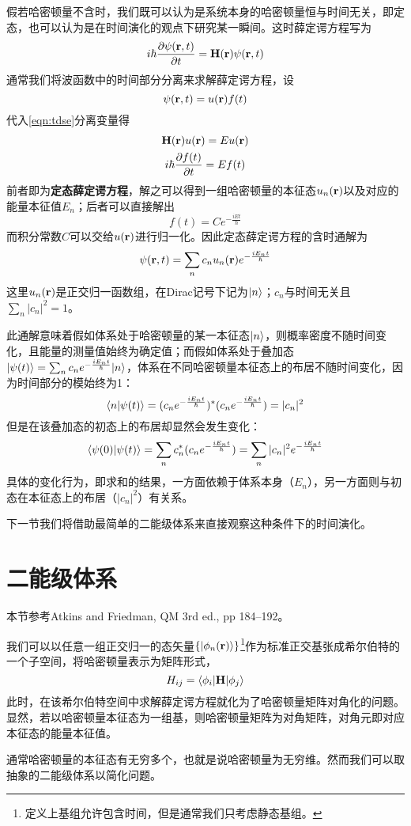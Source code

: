 假若哈密顿量不含时，我们既可以认为是系统本身的哈密顿量恒与时间无关，即定态，也可以认为是在时间演化的观点下研究某一瞬间。这时薛定谔方程写为
\begin{equation}\label{eqn:tdse}
i\hbar \dfrac{\partial \psi(\bm{\mathrm{r}},t)}{\partial t}=\bm{\mathrm{H}}(\bm{\mathrm{r}}) \psi(\bm{\mathrm{r}},t)
\end{equation}
通常我们将波函数中的时间部分分离来求解薛定谔方程，设
\begin{equation}\label{key}
\psi(\bm{\mathrm{r}},t)=u(\bm{\mathrm{r}})f(t)
\end{equation}
代入\eqref{eqn:tdse}分离变量得
\begin{gather}
\bm{\mathrm{H}}(\bm{\mathrm{r}}) u(\bm{\mathrm{r}})=E u(\bm{\mathrm{r}})\label{eqn:TISE}\\
i\hbar \dfrac{\partial f(t)}{\partial t}=Ef(t)\label{eqn:timepart}
\end{gather}
前者即为\textbf{定态薛定谔方程}，解之可以得到一组哈密顿量的本征态$ u_n(\bm{\mathrm{r}}) $以及对应的能量本征值$ E_n $；后者可以直接解出
\begin{equation}\label{key}
f(t)=Ce^{-\frac{iEt}{\hbar}}
\end{equation}
而积分常数$ C $可以交给$ u(\bm{\mathrm{r}}) $进行归一化。因此定态薛定谔方程的含时通解为
\begin{equation}\label{key}
\psi(\bm{\mathrm{r}},t)=\sum_nc_nu_n(\bm{\mathrm{r}})e^{-\frac{iE_nt}{\hbar}}
\end{equation}
这里$ u_n(\bm{\mathrm{r}}) $是正交归一函数组，在Dirac记号下记为$ |n\rangle $；$ c_n $与时间无关且$ \sum_n |c_n|^2=1 $。

此通解意味着假如体系处于哈密顿量的某一本征态$ |n\rangle $，则概率密度不随时间变化，且能量的测量值始终为确定值；而假如体系处于叠加态$ |\psi(t)\rangle=\sum_nc_ne^{-\frac{iE_nt}{\hbar}}|n\rangle $，体系在不同哈密顿量本征态上的布居不随时间变化，因为时间部分的模始终为1：
\begin{equation}\label{key}
\langle n|\psi(t)\rangle=(c_ne^{-\frac{iE_nt}{\hbar}})^*(c_ne^{-\frac{iE_nt}{\hbar}})=|c_n|^2
\end{equation} 
但是在该叠加态的初态上的布居却显然会发生变化：
\begin{equation}\label{key}
\langle\psi(0)|\psi(t)\rangle=\sum_nc_n^*(c_ne^{-\frac{iE_nt}{\hbar}})=\sum_n|c_n|^2e^{-\frac{iE_nt}{\hbar}}
\end{equation}
具体的变化行为，即求和的结果，一方面依赖于体系本身（$ E_n $），另一方面则与初态在本征态上的布居（$ |c_n|^2 $）有关系。

下一节我们将借助最简单的二能级体系来直接观察这种条件下的时间演化。

\section{二能级体系}
\begin{framed}
本节参考Atkins and Friedman, QM 3rd ed., pp 184--192。
\end{framed}
我们可以以任意一组正交归一的态矢量$ \{|\phi_n(\bm{\mathrm{r}})\rangle\} $\footnote{定义上基组允许包含时间，但是通常我们只考虑静态基组。}作为标准正交基张成希尔伯特的一个子空间，将哈密顿量表示为矩阵形式，
\begin{equation}\label{key}
H_{ij}=\langle \phi_i|\bm{\mathrm{H}}|\phi_j\rangle
\end{equation}
此时，在该希尔伯特空间中求解薛定谔方程就化为了哈密顿量矩阵对角化的问题。显然，若以哈密顿量本征态为一组基，则哈密顿量矩阵为对角矩阵，对角元即对应本征态的能量本征值。

通常哈密顿量的本征态有无穷多个，也就是说哈密顿量为无穷维。然而我们可以取抽象的二能级体系以简化问题。
